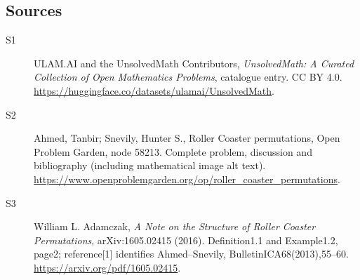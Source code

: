 \documentclass[11pt]{book}
\begin{document}
\subsection{Sources}
\begin{description}
\item[\hypertarget{source:statement:1}{S1}] ULAM.AI and the UnsolvedMath Contributors, \emph{UnsolvedMath: A Curated Collection of Open Mathematics Problems}, catalogue entry. CC BY 4.0. \url{https://huggingface.co/datasets/ulamai/UnsolvedMath}.
\item[\hypertarget{source:statement:2}{S2}] Ahmed, Tanbir; Snevily, Hunter S., Roller Coaster permutations, Open Problem Garden, node 58213. Complete problem, discussion and bibliography (including mathematical image alt text). \url{https://www.openproblemgarden.org/op/roller_coaster_permutations}.
\item[\hypertarget{source:statement:3}{S3}] William L. Adamczak, \emph{A Note on the Structure of Roller Coaster Permutations}, arXiv:1605.02415 (2016). Definition1.1 and Example1.2, page2; reference[1] identifies Ahmed--Snevily, BulletinICA68(2013),55--60. \url{https://arxiv.org/pdf/1605.02415}.
\end{description}
\label{end:statement}
\end{document}
